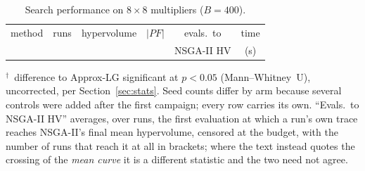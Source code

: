 \documentclass[acmsmall,review,anonymous]{acmart}
\begin{document}
\begin{table}[t]
\caption{Search performance on $8\times8$ multipliers ($B=400$).}
\label{tab:search}
\centering\footnotesize
\setlength{\tabcolsep}{3pt}
\begin{tabular}{lccccc}
\toprule
method & runs & hypervolume & $|PF|$ & evals.\ to & time\\
       &      &             &        & NSGA-II HV & (s)\\
\midrule

\bottomrule
\end{tabular}

\smallskip
{\footnotesize $^{\dagger}$~difference to Approx-LG significant at $p<0.05$
(Mann--Whitney~U), uncorrected, per Section~\ref{sec:stats}.  Seed counts differ
by arm because several controls were added after the first campaign; every row
carries its own.  ``Evals.\ to NSGA-II HV'' averages, over runs, the
first evaluation at which a run's own trace reaches NSGA-II's final mean
hypervolume, censored at the budget, with the number of runs that reach it at
all in brackets; where the text instead quotes the crossing of the \emph{mean
curve} it is a different statistic and the two need not agree.}
\end{table}
\end{document}
